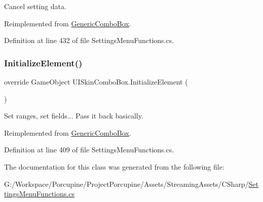Cancel setting data. 



Reimplemented from \hyperlink{class_generic_combo_box_a0949a84cf1e33d13346cb90597e005ce}{Generic\+Combo\+Box}.



Definition at line 432 of file Settings\+Menu\+Functions.\+cs.

\mbox{\label{class_u_i_skin_combo_box_a4d7b16b8368b3cc075fa026a6e60af88}} 
\subsubsection{\texorpdfstring{Initialize\+Element()}{InitializeElement()}}
{\footnotesize\ttfamily override Game\+Object U\+I\+Skin\+Combo\+Box.\+Initialize\+Element (\begin{DoxyParamCaption}{ }\end{DoxyParamCaption})\hspace{0.3cm}{\ttfamily [virtual]}}



Set ranges, set fields... Pass it back basically. 



Reimplemented from \hyperlink{class_generic_combo_box_ae1800a7c68d3af046a2b147e117437ff}{Generic\+Combo\+Box}.



Definition at line 409 of file Settings\+Menu\+Functions.\+cs.



The documentation for this class was generated from the following file\+:\begin{DoxyCompactItemize}
\item 
G\+:/\+Workspace/\+Porcupine/\+Project\+Porcupine/\+Assets/\+Streaming\+Assets/\+C\+Sharp/\hyperlink{_settings_menu_functions_8cs}{Settings\+Menu\+Functions.\+cs}\end{DoxyCompactItemize}
